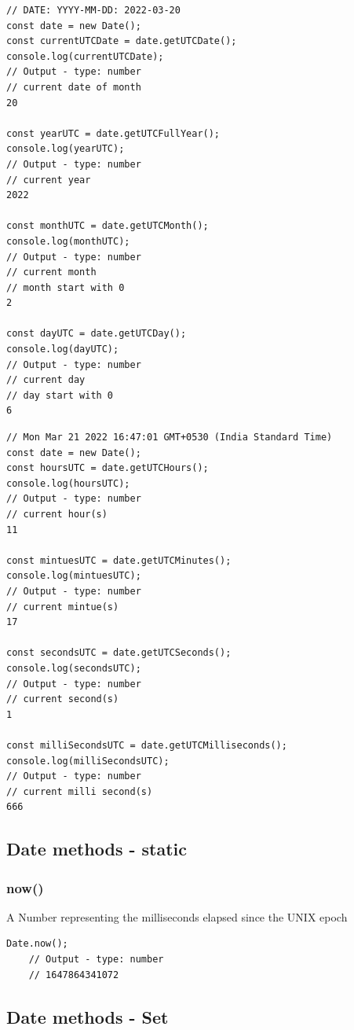 \documentclass[10pt]{article}
\begin{document}
\begin{lstlisting}[style=ES6, caption={UTC Date methods - I}]
// DATE: YYYY-MM-DD: 2022-03-20
const date = new Date();
const currentUTCDate = date.getUTCDate();
console.log(currentUTCDate);
// Output - type: number
// current date of month
20

const yearUTC = date.getUTCFullYear();
console.log(yearUTC);
// Output - type: number
// current year
2022

const monthUTC = date.getUTCMonth();
console.log(monthUTC);
// Output - type: number
// current month
// month start with 0
2

const dayUTC = date.getUTCDay();
console.log(dayUTC);
// Output - type: number
// current day
// day start with 0
6
\end{lstlisting}
\begin{lstlisting}[style=ES6, caption={UTC Date methods - II}]
// Mon Mar 21 2022 16:47:01 GMT+0530 (India Standard Time)
const date = new Date();
const hoursUTC = date.getUTCHours();
console.log(hoursUTC);
// Output - type: number
// current hour(s)
11

const mintuesUTC = date.getUTCMinutes();
console.log(mintuesUTC);
// Output - type: number
// current mintue(s)
17

const secondsUTC = date.getUTCSeconds();
console.log(secondsUTC);
// Output - type: number
// current second(s)
1

const milliSecondsUTC = date.getUTCMilliseconds();
console.log(milliSecondsUTC);
// Output - type: number
// current milli second(s)
666
\end{lstlisting}

\subsection{Date methods - static}

\subsubsection{now()}

A Number representing the milliseconds elapsed since the UNIX epoch

\begin{lstlisting}[style=ES6, caption={Date methods - static now}]
	Date.now();
	// Output - type: number
	// 1647864341072
\end{lstlisting}

\subsection{Date methods - Set}
\end{document}

